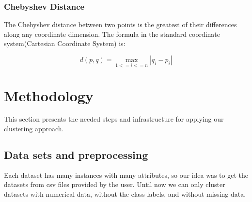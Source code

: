 \documentclass[conference]{IEEEtran}
\begin{document}
\subsubsection{Chebyshev Distance}

The Chebyshev distance between two points is the greatest of their differences along any coordinate dimension. The formula in the standard coordinate system(Cartesian Coordinate System) is:

\begin{equation}
	d(p,q) = \max_{1<=i<=n} |q_i - p_i|
\end{equation}

\section{Methodology}
\label{Methodology}

This section presents the needed steps and infrastructure for applying our clustering approach.

\subsection{Data sets and preprocessing}

Each dataset has many instances with many attributes, so our idea was to get the datasets from csv \cite{website:csv} files provided by the user. Until now we can only cluster datasets with numerical data, without the class labels, and without missing data.
\end{document}
